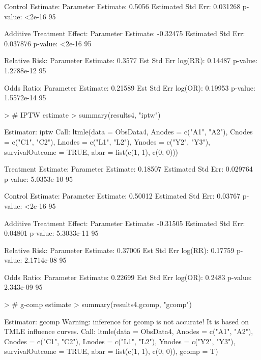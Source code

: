 \documentclass[answers]{exam}
\begin{document}
\begin{solution}
\begin{Schunk}
\begin{Soutput}
Control Estimate:
   Parameter Estimate:  0.5056 
    Estimated Std Err:  0.031268 
              p-value:  <2e-16 
    95%

Additive Treatment Effect:
   Parameter Estimate:  -0.32475 
    Estimated Std Err:  0.037876 
              p-value:  <2e-16 
    95%

Relative Risk:
   Parameter Estimate:  0.3577 
  Est Std Err log(RR):  0.14487 
              p-value:  1.2788e-12 
    95%

Odds Ratio:
   Parameter Estimate:  0.21589 
  Est Std Err log(OR):  0.19953 
              p-value:  1.5572e-14 
    95%
\end{Soutput}
\end{Schunk}
\begin{Schunk}
\begin{Sinput}
> # IPTW estimate
> summary(results4, "iptw")
\end{Sinput}
\begin{Soutput}
Estimator:  iptw 
Call:
ltmle(data = ObsData4, Anodes = c("A1", "A2"), Cnodes = c("C1", 
    "C2"), Lnodes = c("L1", "L2"), Ynodes = c("Y2", "Y3"), survivalOutcome = TRUE, 
    abar = list(c(1, 1), c(0, 0)))

Treatment Estimate:
   Parameter Estimate:  0.18507 
    Estimated Std Err:  0.029764 
              p-value:  5.0353e-10 
    95%

Control Estimate:
   Parameter Estimate:  0.50012 
    Estimated Std Err:  0.03767 
              p-value:  <2e-16 
    95%

Additive Treatment Effect:
   Parameter Estimate:  -0.31505 
    Estimated Std Err:  0.04801 
              p-value:  5.3033e-11 
    95%

Relative Risk:
   Parameter Estimate:  0.37006 
  Est Std Err log(RR):  0.17759 
              p-value:  2.1714e-08 
    95%

Odds Ratio:
   Parameter Estimate:  0.22699 
  Est Std Err log(OR):  0.2483 
              p-value:  2.343e-09 
    95%
\end{Soutput}
\end{Schunk}
\begin{Schunk}
\begin{Sinput}
> # g-comp estimate
> summary(results4.gcomp, "gcomp")
\end{Sinput}
\begin{Soutput}
Estimator:  gcomp 
Warning: inference for gcomp is not accurate! It is based on TMLE influence curves.
Call:
ltmle(data = ObsData4, Anodes = c("A1", "A2"), Cnodes = c("C1", 
    "C2"), Lnodes = c("L1", "L2"), Ynodes = c("Y2", "Y3"), survivalOutcome = TRUE, 
    abar = list(c(1, 1), c(0, 0)), gcomp = T)


\end{Soutput}
\end{Schunk}
\end{solution}
\end{document}
